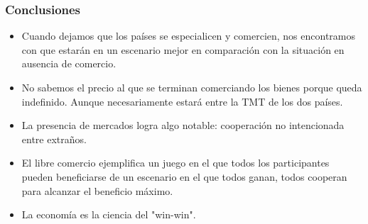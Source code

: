\documentclass{beamer}
\begin{document}
\begin{frame}
    \frametitle{Conclusiones}
    \begin{itemize}
        \item Cuando dejamos que los países se especialicen y comercien, nos encontramos con que estarán en un escenario mejor en comparación con la situación en ausencia de comercio.
        \item No sabemos el precio al que se terminan comerciando los bienes porque queda indefinido. Aunque necesariamente estará entre la TMT de los dos países.
        \item La presencia de mercados logra algo notable: cooperación no intencionada entre extraños.
        \item El libre comercio ejemplifica un juego en el que todos los participantes pueden beneficiarse de un escenario en el que todos ganan, todos cooperan para alcanzar el beneficio máximo.
        \item La economía es la ciencia del "win-win".
    \end{itemize}
\end{frame}
\end{document}
